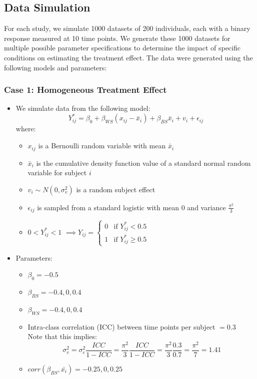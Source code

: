 \documentclass{article}
\begin{document}
          
            
    \subsection{Data Simulation}
        For each study, we simulate 1000 datasets of 200 individuals, each with a binary response measured at 10 time points. We generate these 1000 datasets for multiple possible parameter specifications to determine the impact of specific conditions on estimating the treatment effect. The data were generated using the following models and parameters: 
        \subsubsection{Case 1: Homogeneous Treatment Effect}
        \begin{itemize}
            \item We simulate data from the following model: $$Y_{ij}^* = \beta_0 + \beta_{WS}(x_{ij}-\bar{x}_i) + \beta_{BS}\bar{x}_i + v_i + \epsilon_{ij}$$
            where:
            \begin{itemize}
                \item $x_{ij}$ is a Bernoulli random variable with mean $\bar{x}_i$
                \item $\bar{x}_i$ is the cumulative density function value of a standard normal random variable for subject $i$
                \item $v_i \sim  N(0, \sigma^2_v)$ is a random subject effect
                \item $\epsilon_{ij}$ is sampled from a standard logistic with mean 0 and variance $\frac{\pi^2}{3}$
                \item $ 0 < Y_{ij}^* < 1$   $\implies Y_{ij} = 
                    \begin{cases}
                        0 & \text{if } Y_{ij }^* < 0.5\\    
                        1 & \text{if } Y_{ij }^* \ge 0.5    
                    \end{cases}$
            \end{itemize}
            \item Parameters:
            \begin{itemize}
                \item $\beta_0 = -0.5$
                \item $\beta_{BS} = -0.4, 0, 0.4$
                \item $\beta_{WS} = -0.4, 0, 0.4$
                \item Intra-class correlation (ICC) between time points per subject $= 0.3$ \\
                Note that this implies: $$\sigma^2_v = \sigma^2_e \frac{ICC}{1-ICC} = \frac{\pi^2}{3}\frac{ICC}{1-ICC} = \frac{\pi^2}{3}\frac{0.3}{0.7} = \frac{\pi^2}{7} = 1.41$$
                \item $corr(\beta_{BS}, \bar{x_i}) = -0.25, 0, 0.25$


\end{itemize}
\end{itemize}
\end{document}
